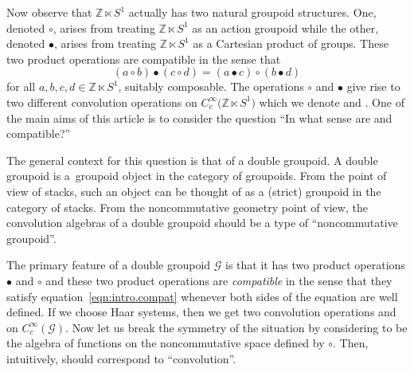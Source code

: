 \documentclass[10pt,a4paper]{amsart}
\numberwithin{equation}{section}
\theoremstyle{definition}
\newcommand{\BBZ}{\mathbb{Z}}
\newcommand{\CG}{\mathcal{G}}
\newcommand{\stardot}{\overset{{\bullet}}{*}}
\newcommand{\starcirc}{\overset{\circ}{*}}
\begin{document}
Now observe that $ \BBZ \ltimes S^1 $ actually has two natural groupoid structures. One, denoted $ \circ$, arises from treating $ \BBZ \ltimes S^1 $ as an action groupoid while the other, denoted $ \bullet $, arises from treating $ \BBZ \ltimes S^1 $ as a Cartesian product of groups. These two product operations are compatible in the sense that
\begin{equation}\label{eqn:intro.compat}
(a \circ b) \bullet ( c \circ d) = (a \bullet c) \circ (b \bullet d )
\end{equation}
for all $ a,b,c,d \in \BBZ \ltimes S^1 $, suitably composable. The operations $ \circ $ and $ \bullet $ give rise to two different convolution operations on $ C_c^\infty\big(\BBZ \ltimes S^1\big) $ which we denote \smash{$ \starcirc $} and \smash{$ \stardot $}. One of the main aims of this article is to consider the question ``In what sense are \smash{$ \stardot $} and \smash{$ \starcirc$} compatible?''

The general context for this question is that of a double groupoid. A double groupoid is a~groupoid object in the category of groupoids. From the point of view of stacks, such an object can be thought of as a (strict) groupoid in the category of stacks. From the noncommutative geometry point of view, the convolution algebras of a double groupoid should be a type of ``noncommutative groupoid''.

The primary feature of a double groupoid $ \CG $ is that it has two product operations $ \bullet $ and $ \circ $ and these two product operations are \emph{compatible} in the sense that they satisfy equation~\eqref{eqn:intro.compat} whenever both sides of the equation are well defined.
If we choose Haar systems, then we get two convolution operations \smash{$ \starcirc $} and \smash{$ \stardot $} on $ C_c^\infty(\CG) $. Now let us break the symmetry of the situation by considering \smash{$ \starcirc$} to be the algebra of functions on the noncommutative space defined by $ \circ $. Then, intuitively, \smash{$ \stardot$} should correspond to ``convolution''.
\end{document}
